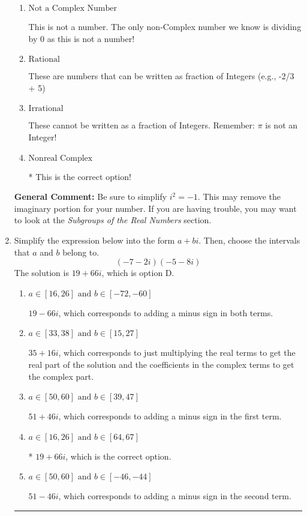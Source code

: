 \documentclass{extbook}[14pt]
\newcommand{\litem}[1]{\item #1

\rule{\textwidth}{0.4pt}}
\begin{document}
\begin{enumerate}
{\begin{enumerate}[label=\Alph*.]
This is a Complex number $(a+bi)$ that \textbf{only} has an imaginary part like $2i$.
\item \( \text{Not a Complex Number} \)

This is not a number. The only non-Complex number we know is dividing by 0 as this is not a number!
\item \( \text{Rational} \)

These are numbers that can be written as fraction of Integers (e.g., -2/3 + 5)
\item \( \text{Irrational} \)

These cannot be written as a fraction of Integers. Remember: $\pi$ is not an Integer!
\item \( \text{Nonreal Complex} \)

* This is the correct option!
\end{enumerate}

\textbf{General Comment:} Be sure to simplify $i^2 = -1$. This may remove the imaginary portion for your number. If you are having trouble, you may want to look at the \textit{Subgroups of the Real Numbers} section.
}
\litem{
Simplify the expression below into the form $a+bi$. Then, choose the intervals that $a$ and $b$ belong to.
\[ (-7 - 2 i)(-5 - 8 i) \]
The solution is \( 19 + 66 i \), which is option D.\begin{enumerate}[label=\Alph*.]
\item \( a \in [16, 26] \text{ and } b \in [-72, -60] \)

 $19 - 66 i$, which corresponds to adding a minus sign in both terms.
\item \( a \in [33, 38] \text{ and } b \in [15, 27] \)

 $35 + 16 i$, which corresponds to just multiplying the real terms to get the real part of the solution and the coefficients in the complex terms to get the complex part.
\item \( a \in [50, 60] \text{ and } b \in [39, 47] \)

 $51 + 46 i$, which corresponds to adding a minus sign in the first term.
\item \( a \in [16, 26] \text{ and } b \in [64, 67] \)

* $19 + 66 i$, which is the correct option.
\item \( a \in [50, 60] \text{ and } b \in [-46, -44] \)

 $51 - 46 i$, which corresponds to adding a minus sign in the second term.
\end{enumerate}

}
\end{enumerate}
\end{document}
